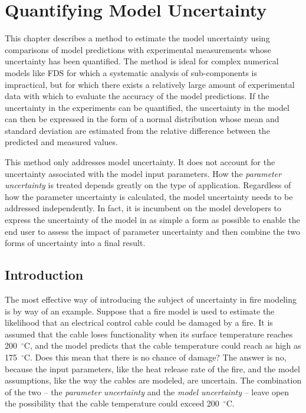 
\chapter{Quantifying Model Uncertainty}
\label{Error_Chapter}

This chapter describes a method to estimate the model uncertainty using comparisons of model predictions with experimental measurements whose uncertainty has been quantified. The method is ideal for complex numerical models like FDS for which a systematic analysis of sub-components is impractical, but for which there exists a relatively large amount of experimental data with which to evaluate the accuracy of the model predictions. If the uncertainty in the experiments can be quantified, the uncertainty in the model can then be expressed in the form of a normal distribution whose mean and standard deviation are estimated from the relative difference between the predicted and measured values.

This method only addresses model uncertainty. It does not account for the uncertainty associated with the model input parameters. How the {\em parameter uncertainty} is treated depends greatly on the type of application. Regardless of how the parameter uncertainty is calculated, the model uncertainty needs to be addressed independently. In fact, it is incumbent on the model developers to express the uncertainty of the model in as simple a form as possible to enable the end user to assess the impact of parameter uncertainty and then combine the two forms of uncertainty into a final result.


\section{Introduction}

The most effective way of introducing the subject of uncertainty in fire modeling is by way of an example. Suppose that a fire model is used to estimate the likelihood that an electrical control cable could be damaged by a fire. It is assumed that the cable loses functionality when its surface temperature reaches 200~$^\circ$C, and the model predicts that the cable temperature could reach as high as 175~$^\circ$C. Does this mean that there is no chance of damage? The answer is no, because the input parameters, like the heat release rate of the fire, and the model assumptions, like the way the cables are modeled, are uncertain. The combination of the two -- the {\em parameter uncertainty} and the {\em model uncertainty} -- leave open the possibility that the cable temperature could exceed 200~$^\circ$C.


